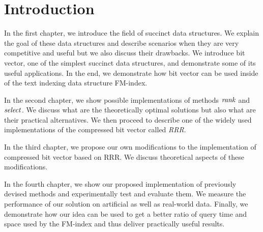 \chapter*{Introduction} %

In the first chapter, we introduce the field of succinct data structures.
We explain the goal of these data structures and describe scenarios when
they are very competitive and useful but we also discuss their drawbacks.
We introduce bit vector, one of the simplest succinct data structures, and
demonstrate some of its useful applications. In the end, we demonstrate how
bit vector can be used inside of the text indexing data structure FM-index.

In the second chapter, we show possible implementations of methods $\mathit{rank}$ and
$\mathit{select}$. We discuss what are the theoretically optimal solutions but also
what are their practical alternatives. We then proceed to describe one of the
widely used implementations of the compressed bit vector called \textit{RRR}.

In the third chapter, we propose our own modifications to the implementation of
compressed bit vector based on RRR. We discuss theoretical aspects of these
modifications.

In the fourth chapter, we show our proposed implementation of previously devised
methods and experimentally test and evaluate them. We measure the performance
of our solution on artificial as well as real-world data. Finally, we demonstrate
how our idea can be used to get a better ratio of query time and space used by the
FM-index and thus deliver practically useful results.